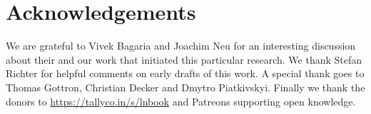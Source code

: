 \documentclass[conference]{IEEEtran}
\begin{document}
\section{Acknowledgements}
\label{sec:ack}
We are grateful to Vivek Bagaria and Joachim Neu for an interesting discussion about their and our work that initiated this particular research. We thank Stefan Richter for helpful comments on early drafts of this work. A special thank goes to Thomas Gottron, Christian Decker and Dmytro Piatkivskyi. Finally we thank the donors to \url{https://tallyco.in/s/lnbook} and Patreons supporting open knowledge. 



\end{document}
